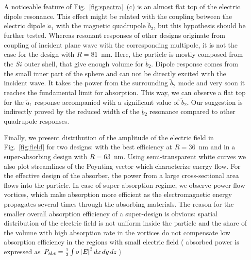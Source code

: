 \documentclass[aps,prl,twocolumn,showpacs,superscriptaddress,groupedaddress]{revtex4-1}
\begin{document}
A noticeable feature of Fig.~\ref{fig:spectra}~(c) is an almost flat
top of the electric dipole resonance.
This effect might be related with the coupling between the electric
dipole $\tilde{a}_1$ with the magnetic quadrupole $\tilde{b}_2$, but
this hypothesis should be further tested.  Whereas resonant responses
of other designs originate from coupling of incident plane wave with
the corresponding multipole, it is not the case for the design with
$R=81$~nm. Here, the particle is mostly composed from the $Si$ outer
shell, that give enough volume for $\tilde{b}_2$.  Dipole response
comes from the small inner part of the sphere and can not be directly
excited with the incident wave.  It takes the power from the
surrounding $\tilde{b}_2$ mode and very soon it reaches the
fundamental limit for absorption.  This way, we can observe a flat top
for the $\tilde{a}_1$ response accompanied with a significant value of
$\tilde{b}_2$.  Our suggestion is indirectly proved by the reduced
width of the $\tilde{b}_2$ resonance compared to other quadrupole
responses.

\begin{figure}
\end{figure}
Finally, we present distribution of the amplitude of the electric
field in Fig.~\ref{fig:field} for two designs: with the best
efficiency at $R=36$~nm and in a super-absorbing design with
$R=63$~nm.  Using semi-transparent white curves we also plot
streamlines of the Poynting vector which characterize energy flow.
For the effective design of the absorber, the power from a large
cross-sectional area flows into the particle.  In case of
super-absorption regime, we observe power flow vortices, which make
absorption more efficient as the electromagnetic energy propagates
several times through the absorbing materials.  The reason for the
smaller overall absorption efficiency of a super-design is obvious:
spatial distribution of the electric field is not uniform inside the
particle and the share of the volume with high absorption rate in the
vortices do not compensate low absorption efficiency in the regions
with small electric field ( absorbed power is expressed as $P_{\rm
  abs}=\frac{1}{2}\int\sigma \left|E\right|^2dx\,dy\,dz$)
\end{document}
